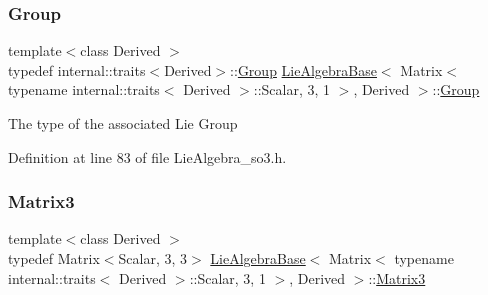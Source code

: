 \subsubsection{\texorpdfstring{Group}{Group}}
{\footnotesize\ttfamily template$<$class Derived $>$ \\
typedef internal\+::traits$<$Derived$>$\+::\hyperlink{class_lie_algebra_base_3_01_matrix_3_01typename_01internal_1_1traits_3_01_derived_01_4_1_1_scalabfa0bdce6d9781ee940346c3f6d91f4e_ac400b52908b18fbf91ce3f942c2841e9}{Group} \hyperlink{class_lie_algebra_base}{Lie\+Algebra\+Base}$<$ Matrix$<$ typename internal\+::traits$<$ Derived $>$\+::Scalar, 3, 1 $>$, Derived $>$\+::\hyperlink{class_lie_algebra_base_3_01_matrix_3_01typename_01internal_1_1traits_3_01_derived_01_4_1_1_scalabfa0bdce6d9781ee940346c3f6d91f4e_ac400b52908b18fbf91ce3f942c2841e9}{Group}}

The type of the associated Lie Group 

Definition at line 83 of file Lie\+Algebra\+\_\+so3.\+h.

\hypertarget{class_lie_algebra_base_3_01_matrix_3_01typename_01internal_1_1traits_3_01_derived_01_4_1_1_scalabfa0bdce6d9781ee940346c3f6d91f4e_a76b0bda7b6a5390a434df96474c582db}{}\label{class_lie_algebra_base_3_01_matrix_3_01typename_01internal_1_1traits_3_01_derived_01_4_1_1_scalabfa0bdce6d9781ee940346c3f6d91f4e_a76b0bda7b6a5390a434df96474c582db} 
\subsubsection{\texorpdfstring{Matrix3}{Matrix3}}
{\footnotesize\ttfamily template$<$class Derived $>$ \\
typedef Matrix$<$Scalar, 3, 3$>$ \hyperlink{class_lie_algebra_base}{Lie\+Algebra\+Base}$<$ Matrix$<$ typename internal\+::traits$<$ Derived $>$\+::Scalar, 3, 1 $>$, Derived $>$\+::\hyperlink{class_lie_algebra_base_3_01_matrix_3_01typename_01internal_1_1traits_3_01_derived_01_4_1_1_scalabfa0bdce6d9781ee940346c3f6d91f4e_a76b0bda7b6a5390a434df96474c582db}{Matrix3}}

